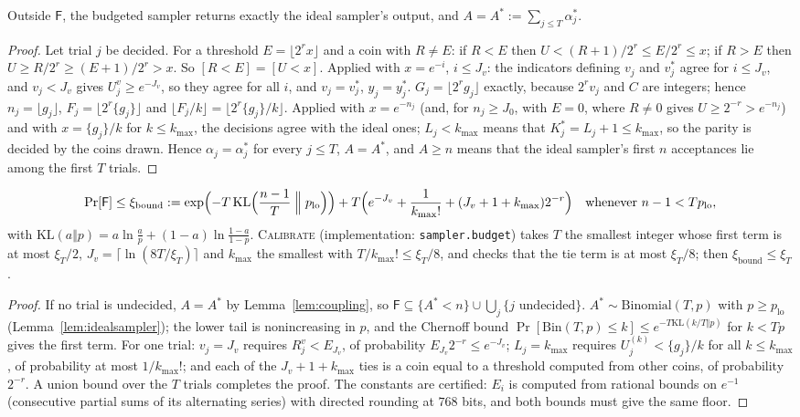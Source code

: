 \begin{lemma}[Coupling]\label{lem:coupling}
Outside $\mathsf F$, the budgeted sampler returns exactly the ideal sampler's output, and $A=A^*:=\sum_{j\le T}\alpha^*_j$.
\end{lemma}
\begin{proof}
Let trial $j$ be decided. For a threshold $E=\lfloor2^rx\rfloor$ and a coin with $R\ne E$: if $R<E$ then $U<(R+1)/2^r\le E/2^r\le x$; if $R>E$ then $U\ge R/2^r\ge(E+1)/2^r>x$. So $[R<E]=[U<x]$. Applied with $x=e^{-i}$, $i\le J_v$: the indicators defining $v_j$ and $v^*_j$ agree for $i\le J_v$, and $v_j<J_v$ gives $U^v_j\ge e^{-J_v}$, so they agree for all $i$, and $v_j=v^*_j$, $y_j=y^*_j$. $G_j=\lfloor2^rg_j\rfloor$ exactly, because $2^rv_j$ and $C$ are integers; hence $n_j=\lfloor g_j\rfloor$, $F_j=\lfloor2^r\{g_j\}\rfloor$ and $\lfloor F_j/k\rfloor=\lfloor2^r\{g_j\}/k\rfloor$. Applied with $x=e^{-n_j}$ (and, for $n_j\ge J_0$, with $E=0$, where $R\ne0$ gives $U\ge2^{-r}>e^{-n_j}$) and with $x=\{g_j\}/k$ for $k\le k_{\max}$, the decisions agree with the ideal ones; $L_j<k_{\max}$ means that $K^*_j=L_j+1\le k_{\max}$, so the parity is decided by the coins drawn. Hence $\alpha_j=\alpha^*_j$ for every $j\le T$, $A=A^*$, and $A\ge n$ means that the ideal sampler's first $n$ acceptances lie among the first $T$ trials.
\end{proof}

\begin{lemma}\label{lem:budgetfail}
\[
  \Pr[\mathsf F]\le\xi_{\mathrm{bound}}:=\exp\Bigl(-T\,\mathrm{KL}\Bigl(\frac{n-1}T\Bigm\Vert p_{\mathrm{lo}}\Bigr)\Bigr)+T\Bigl(e^{-J_v}+\frac1{k_{\max}!}+(J_v+1+k_{\max})2^{-r}\Bigr)\quad\text{whenever }n-1<Tp_{\mathrm{lo}},
\]
with $\mathrm{KL}(a\Vert p)=a\ln\frac ap+(1-a)\ln\frac{1-a}{1-p}$. \textsc{Calibrate} (implementation: \texttt{sampler.budget}) takes $T$ the smallest integer whose first term is at most $\xi_T/2$, $J_v=\lceil\ln(8T/\xi_T)\rceil$ and $k_{\max}$ the smallest with $T/k_{\max}!\le\xi_T/8$, and checks that the tie term is at most $\xi_T/8$; then $\xi_{\mathrm{bound}}\le\xi_T$.
\end{lemma}
\begin{proof}
If no trial is undecided, $A=A^*$ by Lemma~\ref{lem:coupling}, so $\mathsf F\subseteq\{A^*<n\}\cup\bigcup_j\{j\text{ undecided}\}$. $A^*\sim\mathrm{Binomial}(T,p)$ with $p\ge p_{\mathrm{lo}}$ (Lemma~\ref{lem:idealsampler}); the lower tail is nonincreasing in $p$, and the Chernoff bound $\Pr[\mathrm{Bin}(T,p)\le k]\le e^{-T\mathrm{KL}(k/T\Vert p)}$ for $k<Tp$ gives the first term. For one trial: $v_j=J_v$ requires $R^v_j<E_{J_v}$, of probability $E_{J_v}2^{-r}\le e^{-J_v}$; $L_j=k_{\max}$ requires $U^{(k)}_j<\{g_j\}/k$ for all $k\le k_{\max}$, of probability at most $1/k_{\max}!$; and each of the $J_v+1+k_{\max}$ ties is a coin equal to a threshold computed from other coins, of probability $2^{-r}$. A union bound over the $T$ trials completes the proof. The constants are certified: $E_i$ is computed from rational bounds on $e^{-1}$ (consecutive partial sums of its alternating series) with directed rounding at $768$ bits, and both bounds must give the same floor.
\end{proof}

